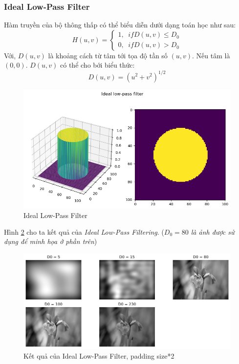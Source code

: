 \documentclass{article}
\begin{document}
        \subsubsection{Ideal Low-Pass Filter}
        Hàm truyền của bộ thông thấp có thể biểu diễn dưới dạng toán học như sau:
        $$
        H(u,v) = \begin{cases}
            1, \phantom{a}if D(u,v) \leq D_0\\
            0,\phantom{a} if D(u,v) > D_0
        \end{cases}
        $$
        Với, $D(u,v)$ là khoảng cách từ tâm tới tọa độ tần số $(u,v)$. Nếu tâm là $(0,0)$. $D(u,v)$ có thể cho bới biểu thức:
        $$ D(u,v) = \left(u^2+v^2\right)^{1/2}$$
        \begin{figure}[ht!]
        \centering
        \includegraphics[width = \linewidth]{fo10.png}
        \caption{Ideal Low-Pass Filter}
        \label{fig11}
        \end{figure}
        Hình \ref{fig10} cho ta kết quả của \textit{Ideal Low-Pass Filtering}. (\textit{$D_0 = 80$ là ảnh được sử dụng để minh họa ở phần trên})
        \begin{figure}[ht!]
        \centering
        \includegraphics[width = \linewidth]{fo9.png}
        \caption{Kết quả của Ideal Low-Pass Filter, padding size*2}
        \label{fig10}
        \end{figure}
        
\end{document}
